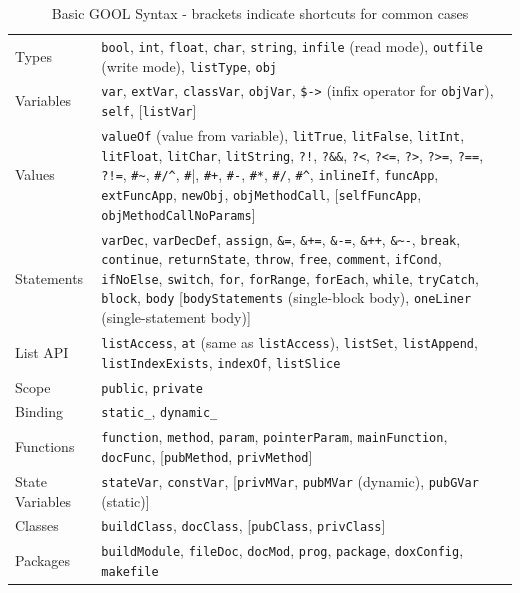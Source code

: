 \documentclass[sigplan,review,prologue,dvipsnames]{acmart}
\begin{document}
\begin{table}[t]
  \caption{Basic GOOL Syntax - brackets indicate shortcuts for common cases}
  \begin{tabular}{p{2.2cm}| p{15cm}}
    Types & \verb|bool|, \verb|int|, \verb|float|, \verb|char|, 
    \verb|string|, 
    \verb|infile| (read mode), \verb|outfile| (write mode), 
    \verb|listType|, 
    \verb|obj| \\
    Variables & \verb|var|, \verb|extVar|, \verb|classVar|, \verb|objVar|, 
    \verb|$->| (infix operator for \verb|objVar|), \verb|self|,
    [\verb|listVar|] \\
    Values & \verb|valueOf| (value from variable), \verb|litTrue|, 
    \verb|litFalse|, \verb|litInt|, 
    \verb|litFloat|, \verb|litChar|, \verb|litString|, \verb|?!|, 
    \verb|?&&|, 
    \verb|?<|, \verb|?<=|, \verb|?>|, \verb|?>=|, \verb|?==|, \verb|?!=|, 
    \verb|#~|, \verb|#/^|, \verb|#||, \verb|#+|, \verb|#-|, \verb|#*|, 
    \verb|#/|, \verb|#^|, \verb|inlineIf|, \verb|funcApp|, 
    \verb|extFuncApp|, 
    \verb|newObj|, \verb|objMethodCall|, [\verb|selfFuncApp|, 
    \verb|objMethodCallNoParams|] \\
    Statements & \verb|varDec|, \verb|varDecDef|, \verb|assign|, \verb|&=|, 
    \verb|&+=|, \verb|&-=|, \verb|&++|, \verb|&~-|, \verb|break|, 
    \verb|continue|, \verb|returnState|, \verb|throw|, \verb|free|, 
    \verb|comment|, \verb|ifCond|, \verb|ifNoElse|, \verb|switch|, 
    \verb|for|, 
    \verb|forRange|, \verb|forEach|, \verb|while|, \verb|tryCatch|, 
    \verb|block|, \verb|body| [\verb|bodyStatements| (single-block body), 
    \verb|oneLiner| (single-statement body)] \\
    List API & \verb|listAccess|, \verb|at| (same as \verb|listAccess|), 
    \verb|listSet|, \verb|listAppend|, \verb|listIndexExists|, 
    \verb|indexOf|, \verb|listSlice| \\
    Scope & \verb|public|, \verb|private| \\
    Binding & \verb|static_|, \verb|dynamic_| \\
    Functions & \verb|function|, \verb|method|, \verb|param|, 
    \verb|pointerParam|, \verb|mainFunction|, \verb|docFunc|, 
    [\verb|pubMethod|, \verb|privMethod|] \\
    State Variables & \verb|stateVar|, \verb|constVar|, [\verb|privMVar|, 
    \verb|pubMVar| (dynamic), \verb|pubGVar| (static)]\\
    Classes & \verb|buildClass|, \verb|docClass|, [\verb|pubClass|, 
    \verb|privClass|]\\
    Packages & \verb|buildModule|, \verb|fileDoc|, \verb|docMod|, 
    \verb|prog|, 
    \verb|package|, \verb|doxConfig|, \verb|makefile|
  \end{tabular}
  \label{tab:syntax}
\end{table}
\end{document}
